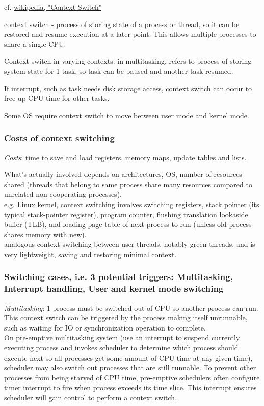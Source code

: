 \documentclass[10pt]{amsart}
\begin{document}
\begin{multicols*}{2}
cf. \href{https://en.wikipedia.org/wiki/Context_switch}{wikipedia, "Context Switch"}

context switch - process of storing state of a process or thread, so it can be restored and resume execution at a later point. This allows multiple processes to share a single CPU.

Context switch in varying contexts: in multitasking, refers to process of storing system state for 1 task, so task can be paused and another task resumed.

If interrupt, such as task needs disk storage access, context switch can occur to free up CPU time for other tasks.

Some OS require context switch to move between user mode and kernel mode.

\subsubsection{Costs of context switching}

\emph{Costs}: time to save and load registers, memory maps, update tables and lists.

What's actually involved depends on architectures, OS, number of resources shared (threads that belong to same process share many resources compared to unrelated non-cooperating processes). \\
e.g. Linux kernel, context switching involves switching registers, stack pointer (its typical stack-pointer register), program counter, flushing translation lookaside buffer (TLB), and loading page table of next process to run (unless old process shares memory with new).  \\
analogous context switching between user threads, notably green threads, and is very lightweight, saving and restoring minimal context. \\

\subsubsection{Switching cases, i.e. 3 potential triggers: Multitasking, Interrupt handling, User and kernel mode switching}

\emph{Multitasking}: 1 process must be switched out of CPU so another process can run. This context switch can be triggered by the process making itself unrunnable, such as waiting for IO or synchronization operation to complete. \\
On pre-emptive multitasking system (use an interrupt to suspend currently executing process and invokes scheduler to determine which process should execute next so all processes get some amount of CPU time at any given time), scheduler may also switch out processes that are still runnable. To prevent other processes from being starved of CPU time, pre-emptive schedulers often configure timer interrupt to fire when process exceeds its time slice. This interrupt ensures scheduler will gain control to perform a context switch. \\


\end{multicols*}
\end{document}
